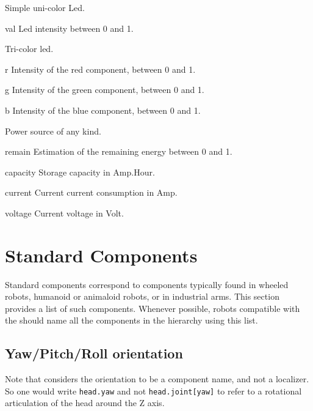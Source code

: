 Simple uni-color Led.

\begin{urbiscriptapi}
\item[val] Led intensity between 0 and 1.
\end{urbiscriptapi}



Tri-color led.

\begin{urbiscriptapi}
\item[r] Intensity of the red component, between 0 and 1.
\item[g] Intensity of the green component, between 0 and 1.
\item[b] Intensity of the blue component, between 0 and 1.
\end{urbiscriptapi}


Power source of any kind.

\begin{urbiscriptapi}
\item[remain] Estimation of the remaining energy between 0 and 1.
\item[capacity] Storage capacity in Amp.Hour.
\item[current] Current current consumption in Amp.
\item[voltage] Current voltage in Volt.
\end{urbiscriptapi}


\section{Standard Components}

Standard components correspond to components typically found in wheeled
robots, humanoid or animaloid robots, or in industrial arms. This section
provides a list of such components. Whenever possible, robots compatible with
the \gsrapi should name all the components in the hierarchy using this list.

\subsection{Yaw/Pitch/Roll orientation}
\label{sec:naming:ypr}

Note that \gsrapi considers the orientation to be a component name, and not
a localizer. So one would write \lstinline|head.yaw| and not
\lstinline|head.joint[yaw]| to refer to a rotational articulation of the
head around the Z axis.

